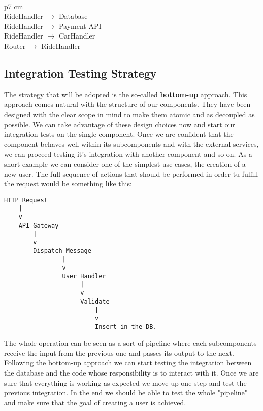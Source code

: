     \\
    \begin{tabular}{ p{7 cm} }
      \hline
       \\
      \hline
      RideHandler $ \rightarrow $ Database \\ \hline
      RideHandler $ \rightarrow $ Payment API \\ \hline
      RideHandler $ \rightarrow $ CarHandler \\ \hline
      Router $ \rightarrow $ RideHandler \\
      \hline
      \vspace{1mm}
    \end{tabular}

\subsection{Integration Testing Strategy}
The strategy that will be adopted is the so-called \textbf{bottom-up} approach.
This approach comes natural with the structure of our components. They have been
designed with the clear scope in mind to make them atomic and as decoupled as possible.
We can take advantage of these design choices now and start our integration tests
on the single component. Once we are confident that the component behaves
well within its subcomponents and with the external services, we can proceed testing
it's integration with another component and so on.
As a short example we can consider one of the simplest use cases, the creation of a new user.
The full sequence of actions that should be performed in order tu fulfill the request
would be something like this:
\lstset{basicstyle=\ttfamily\footnotesize,breaklines=true}
\begin{lstlisting}
HTTP Request
    |
    v
    API Gateway
        |
        v
        Dispatch Message
                |
                v 
                User Handler
                     |
                     v
                     Validate
                         |
                         v
                         Insert in the DB.
\end{lstlisting}
The whole operation can be seen as a sort of pipeline where each subcomponents
receive the input from the previous one and passes its output to the next.
Following the bottom-up approach we can start testing the integration between the
database and the code whose responsibility is to interact with it. Once we are sure
that everything is working as expected we move up one step and test the previous integration.
In the end we should be able to test the whole "pipeline" and make sure that the
goal of creating a user is achieved.

